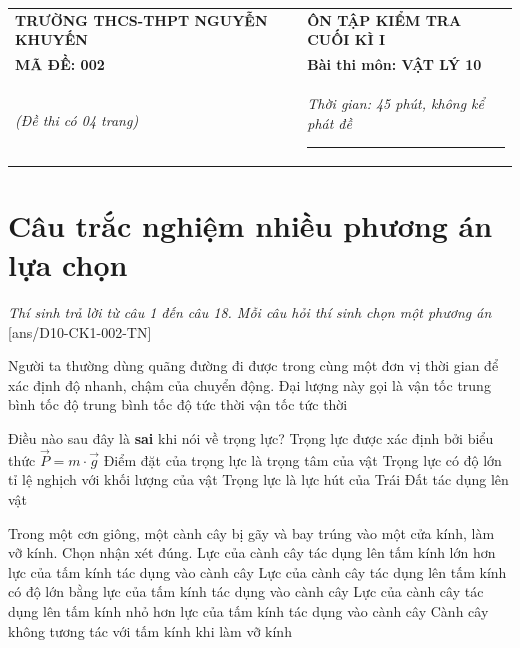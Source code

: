 \begin{center}
	\begin{tabular}{M{10cm}M{8cm}}
		\textbf{TRƯỜNG THCS-THPT NGUYỄN KHUYẾN}& \textbf{ÔN TẬP KIỂM TRA CUỐI KÌ I}\\
		\textbf{MÃ ĐỀ: 002}& \textbf{Bài thi môn: VẬT LÝ 10}\\
		\textit{(Đề thi có 04 trang)}& \textit{Thời gian: 45 phút, không kể phát đề}
		
		\noindent\rule{4cm}{0.8pt} \\
	\end{tabular}
\end{center}
\setcounter{section}{0}
\section{Câu trắc nghiệm nhiều phương án lựa chọn}
\textit{Thí sinh trả lời từ câu 1 đến câu 18. Mỗi câu hỏi thí sinh chọn một phương án}
\setcounter{ex}{0}
[ans/D10-CK1-002-TN]
\begin{ex}
	Người ta thường dùng quãng đường đi được trong cùng một đơn vị thời gian để xác định độ nhanh, chậm của chuyển động. Đại lượng này gọi là
	\choice
	{vận tốc trung bình}
	{\True tốc độ trung bình}
	{tốc độ tức thời}
	{vận tốc tức thời}
	\loigiai{}
\end{ex}
\begin{ex}
	Điều nào sau đây là \textbf{sai} khi nói về trọng lực?
	\choice
	{Trọng lực được xác định bởi biểu thức $\vec{P}=m\cdot\vec{g}$}
	{Điểm đặt của trọng lực là trọng tâm của vật}
	{\True Trọng lực có độ lớn tỉ lệ nghịch với khối lượng của vật}
	{Trọng lực là lực hút của Trái Đất tác dụng lên vật}
	\loigiai{}
\end{ex}
\begin{ex}
	Trong một cơn giông, một cành cây bị gãy và bay trúng vào một cửa kính, làm vỡ kính. Chọn nhận xét đúng.	
	\choice
	{Lực của cành cây tác dụng lên tấm kính lớn hơn lực của tấm kính tác dụng vào cành cây}
	{\True Lực của cành cây tác dụng lên tấm kính có độ lớn bằng lực của tấm kính tác dụng vào cành cây}
	{Lực của cành cây tác dụng lên tấm kính nhỏ hơn lực của tấm kính tác dụng vào cành cây}
	{Cành cây không tương tác với tấm kính khi làm vỡ kính}
	\loigiai{}
\end{ex}
